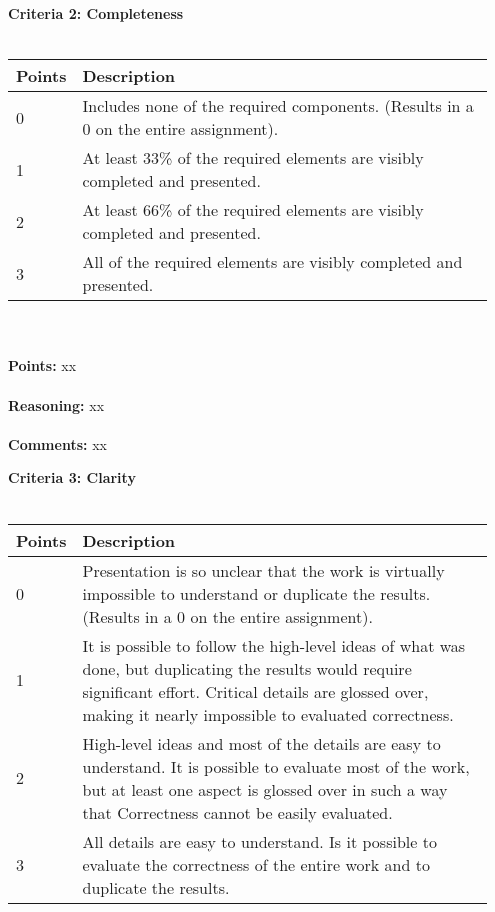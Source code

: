 \documentclass{article}
\begin{document}
\textbf{\large Criteria 2: Completeness} \\
\hspace{1cm} \\
\begin{tabular}{|p{0.075\linewidth}||p{0.875\linewidth}|}
    \hline
    \textbf{Points} & \textbf{Description} \\
    \hline
    \hline
    0      & Includes none of the required components. (Results in a 0 on the entire assignment). \\
    \hline
    1      & At least 33\% of the required elements are visibly completed and presented. \\
    \hline
    2      & At least 66\% of the required elements are visibly completed and presented. \\
    \hline
    3      & All of the required elements are visibly completed and presented. \\
    \hline
\end{tabular} \\

\hspace{1cm} \\
\textbf{\large Points: } xx \\

\hspace{1cm} \\
\textbf{\large Reasoning: } xx \\

\hspace{1cm} \\
\textbf{\large Comments: } xx \\

\pagebreak


\textbf{\large Criteria 3: Clarity} \\
\hspace{1cm} \\
\begin{tabular}{|p{0.075\linewidth}||p{0.875\linewidth}|}
    \hline
    \textbf{Points} & \textbf{Description} \\
    \hline
    \hline
    0      & Presentation is so unclear that the work is virtually impossible to understand or duplicate the results. (Results in a 0 on the entire assignment). \\
    \hline
    1      & It is possible to follow the high-level ideas of what was done, but duplicating the results would require significant effort. Critical details are glossed over, making it nearly impossible to evaluated correctness. \\
    \hline
    2      & High-level ideas and most of the details are easy to understand. It is possible to evaluate most of the work, but at least one aspect is glossed over in such a way that Correctness cannot be easily evaluated. \\
    \hline
    3      & All details are easy to understand. Is it possible to evaluate the correctness of the entire work and to duplicate the results. \\
    \hline
\end{tabular} \\
\end{document}
